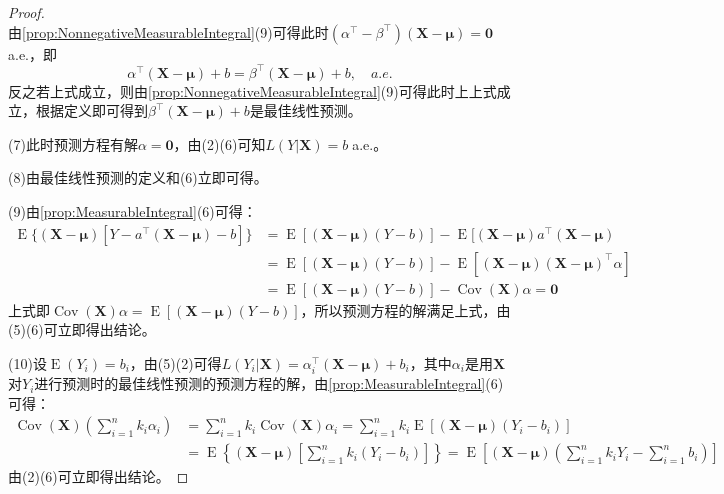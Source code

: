 \begin{proof}
\begin{equation*}
	\end{equation*}
	由\cref{prop:NonnegativeMeasurableIntegral}(9)可得此时$(\alpha^{\top}-\beta^{\top})(\mathbf{X}-\boldsymbol{\mu})=\mathbf{0}\;$a.e.，即
	\begin{equation*}
		\alpha^{\top}(\mathbf{X}-\boldsymbol{\mu})+b=\beta^{\top}(\mathbf{X}-\boldsymbol{\mu})+b,\quad a.e.
	\end{equation*}
	反之若上式成立，则由\cref{prop:NonnegativeMeasurableIntegral}(9)可得此时上上式成立，根据定义即可得到$\beta^{\top}(\mathbf{X}-\boldsymbol{\mu})+b$是最佳线性预测。\par
	(7)此时预测方程有解$\alpha=\mathbf{0}$，由(2)(6)可知$L(Y|\mathbf{X})=b\;$a.e.。\par
	(8)由最佳线性预测的定义和(6)立即可得。\par
	(9)由\cref{prop:MeasurableIntegral}(6)可得：
	\begin{align*}
		\operatorname{E}\{(\mathbf{X}-\boldsymbol{\mu})[Y-a^{\top}(\mathbf{X}-\boldsymbol{\mu})-b]\}&=\operatorname{E}[(\mathbf{X}-\boldsymbol{\mu})(Y-b)]-\operatorname{E}[(\mathbf{X}-\boldsymbol{\mu})a^{\top}(\mathbf{X}-\boldsymbol{\mu}) \\
		&=\operatorname{E}[(\mathbf{X}-\boldsymbol{\mu})(Y-b)]-\operatorname{E}[(\mathbf{X}-\boldsymbol{\mu})(\mathbf{X}-\boldsymbol{\mu})^{\top}\alpha] \\
		&=\operatorname{E}[(\mathbf{X}-\boldsymbol{\mu})(Y-b)]-\operatorname{Cov}(\mathbf{X})\alpha=\mathbf{0}
	\end{align*}
	上式即$\operatorname{Cov}(\mathbf{X})\alpha=\operatorname{E}[(\mathbf{X}-\boldsymbol{\mu})(Y-b)]$，所以预测方程的解满足上式，由(5)(6)可立即得出结论。\par
	(10)设$\operatorname{E}(Y_i)=b_i$，由(5)(2)可得$L(Y_i|\mathbf{X})=\alpha_i^{\top}(\mathbf{X}-\boldsymbol{\mu})+b_i$，其中$\alpha_i$是用$\mathbf{X}$对$Y_i$进行预测时的最佳线性预测的预测方程的解，由\cref{prop:MeasurableIntegral}(6)可得：
	\begin{align*}
		\operatorname{Cov}(\mathbf{X})\left(\sum_{i=1}^{n}k_i\alpha_i\right)&=\sum_{i=1}^{n}k_i\operatorname{Cov}(\mathbf{X})\alpha_i=\sum_{i=1}^{n}k_i\operatorname{E}[(\mathbf{X}-\boldsymbol{\mu})(Y_i-b_i)] \\
		&=\operatorname{E}\left\{(\mathbf{X}-\boldsymbol{\mu})\left[\sum_{i=1}^{n}k_i(Y_i-b_i)\right]\right\} =\operatorname{E}\left[(\mathbf{X}-\boldsymbol{\mu})\left(\sum_{i=1}^{n}k_iY_i-\sum_{i=1}^{n}b_i\right)\right]
	\end{align*}
	由(2)(6)可立即得出结论。\par

\end{proof}
